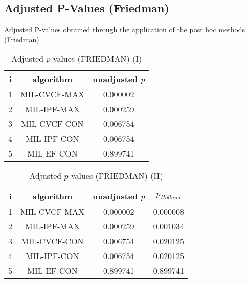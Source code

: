 \documentclass[a4paper,10pt]{article}
\begin{document}
\begin{landscape}
\newpage

\section{Adjusted P-Values (Friedman)}


Adjusted P-values obtained through the application of the post hoc methods (Friedman).

\begin{table}[!htp]
\centering\small
\begin{tabular}{ccc}
i&algorithm&unadjusted $p$\\
\hline1&MIL-CVCF-MAX&0.000002\\2&MIL-IPF-MAX&0.000259\\3&MIL-CVCF-CON&0.006754\\4&MIL-IPF-CON&0.006754\\5&MIL-EF-CON&0.899741\\\hline
\end{tabular}
\caption{Adjusted $p$-values (FRIEDMAN) (I)}
\end{table}
\begin{table}[!htp]
\centering\small
\begin{tabular}{cccc}
i&algorithm&unadjusted $p$&$p_{Holland}$\\
\hline1&MIL-CVCF-MAX&0.000002&0.000008\\2&MIL-IPF-MAX&0.000259&0.001034\\3&MIL-CVCF-CON&0.006754&0.020125\\4&MIL-IPF-CON&0.006754&0.020125\\5&MIL-EF-CON&0.899741&0.899741\\\hline
\end{tabular}
\caption{Adjusted $p$-values (FRIEDMAN) (II)}
\end{table}

\newpage
\end{landscape}
\end{document}
